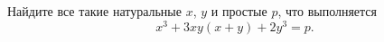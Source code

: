 Найдите все такие натуральные $x$, $y$ и простые $p$, что выполняется
\begin{equation}
  x^3 + 3xy(x + y) + 2y^3 = p.
\end{equation}